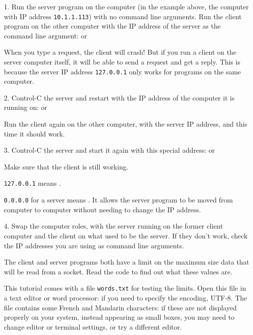 1. Run the server program on the  computer (in the example above, the computer
with IP address \texttt{10.1.1.113}) with no command line arguments.
Run the client program on the other  computer with the IP address of the server
as the command line argument:
or

When you type a request, the client will crash! But if you run a client on the server computer
itself, it will be able to send a request and get a reply. This is because the server IP address
\texttt{127.0.0.1} only works for programs on the same computer.

2. Control-C the server and restart with the IP address of the computer it is running on:
or

Run the client again on the other computer, with the server IP address, and this time
it should work.

3. Control-C the server and start it again with this special address:
or

Make sure that the client is still working.

\begin{IMPORTANT}
\texttt{127.0.0.1} means .

\texttt{0.0.0.0} for a server means . It allows
the server program to be moved from computer to computer without needing to change the
IP address.
\end{IMPORTANT}

4. Swap the computer roles, with the server running on the former client computer and
the client on what used to be the server. If they don't work, check the IP addresses
you are using as command line arguments.



The client and server programs both have a limit on the maximum size data that
will be read from a socket. Read the code to find out what these values are.

This tutorial comes with a file \texttt{words.txt} for testing the limits. Open this
file in a text editor or word processor: if you need to specify the encoding, UTF-8.
The file contains some French and Mandarin characters: if these are not displayed
properly on your system, instead appearing as small boxes, you may need to change
editor or terminal settings, or try a different editor.

